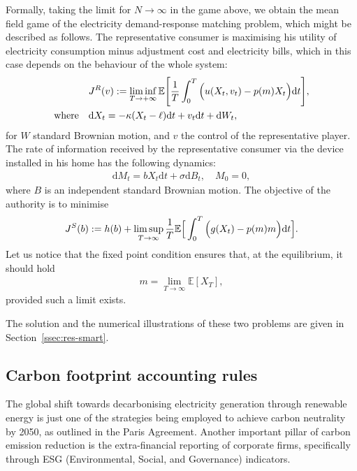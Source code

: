 \documentclass[a4paper,10pt]{article}
\newcommand{\EE}{\mathbb{E}}
\newcommand{\D}{\mathrm{d}}
\theoremstyle{definition}
\theoremstyle{plain}
\numberwithin{equation}{section}
\begin{document}
Formally, taking the limit for $N\to\infty$ in the game above, we obtain the mean field game of the electricity demand-response matching problem, which might be described as follows.
The representative consumer is maximising his utility of electricity consumption minus adjustment cost and electricity bills, which in this case depends on the behaviour of the whole system:
\begin{align}
	&J^{\rm{R}}(v)  := \liminf_{T\to +\infty} \EE\Bigg[ \frac1T \int_0^T \Big( u(X_t,v_t) - p(m) X_t \Big) \D t \Bigg], \\
\text{where} \quad &	\D X_t = -\kappa (X_t - \ell) \D t + v_t \D t + \D W_t, 
\end{align}
for $W$ standard Brownian motion, and $v$ the control of the representative player. 
The rate of information received by the representative consumer via the device installed in his home has the following dynamics:
\begin{align}
	\D M_t = bX_t \D t  + \sigma \D B_t, \quad M_0 =0,
\end{align}
where  $B$ is an independent standard Brownian motion. 
The objective of the authority is to minimise
\begin{align}
	J^{\rm{S}}(b) :=  h(b) + \limsup_{T \to \infty} \frac{1}{T} \EE\Big[ \int_0^T \Big( g(X_t) - p(m) m \Big) \D t\Big].
\end{align}
Let us notice that the fixed point condition ensures that, at the equilibrium, it should hold
\begin{align}
	m = \lim_{T \to \infty} \EE[X_T],
\end{align}
provided such a limit exists.


\medskip

The solution and the numerical illustrations of these two problems are given in Section~\ref{ssec:res-smart}.


\subsection{Carbon footprint accounting rules}\label{sec:carbon}

The global shift towards decarbonising electricity generation through renewable energy is just one of the strategies being employed to achieve carbon neutrality by 2050, as outlined in the Paris Agreement.
Another important pillar of carbon emission reduction is the extra-financial reporting of corporate firms, specifically through ESG (Environmental, Social, and Governance) indicators.
\end{document}

